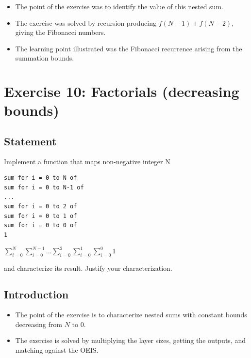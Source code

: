 \documentclass[12pt]{article}
\begin{document}
\begin{itemize}

\item
  The point of the exercise was to identify the value of this nested sum.

\item
  The exercise was solved by recursion producing $f(N-1) + f(N-2)$, giving the Fibonacci numbers.

\item
  The learning point illustrated was the Fibonacci recurrence arising from the summation bounds.

\end{itemize}


\newpage

\section{Exercise 10: Factorials (decreasing bounds)}


\subsection{Statement}

Implement a function that maps non-negative integer N

\begin{verbatim}
sum for i = 0 to N of
sum for i = 0 to N-1 of
...
sum for i = 0 to 2 of
sum for i = 0 to 1 of
sum for i = 0 to 0 of
1
\end{verbatim}

$\displaystyle\sum_{i=0}^{N}\sum_{i=0}^{N-1}\dots\sum_{i=0}^{2}\sum_{i=0}^{1}\sum_{i=0}^{0}1$

and characterize its result. Justify your characterization.


\subsection{Introduction}

\begin{itemize}

\item
  The point of the exercise is to characterize nested sums with constant bounds decreasing from $N$ to 0.

\item
  The exercise is solved by multiplying the layer sizes, getting the outputs, and matching against the OEIS.

\end{itemize}
\end{document}
